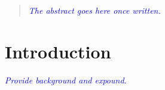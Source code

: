 \documentclass[onecolumn,draftcls]{IEEEtran}
\begin{document}
% 








\maketitle

\begin{abstract}
\textcolor{blue}{\textit{The abstract goes here once written.}}
\end{abstract}





%
\IEEEpeerreviewmaketitle



\section{Introduction} \label{intro}
\textcolor{blue}{\textit{Provide background and expound.}}
\end{document}
